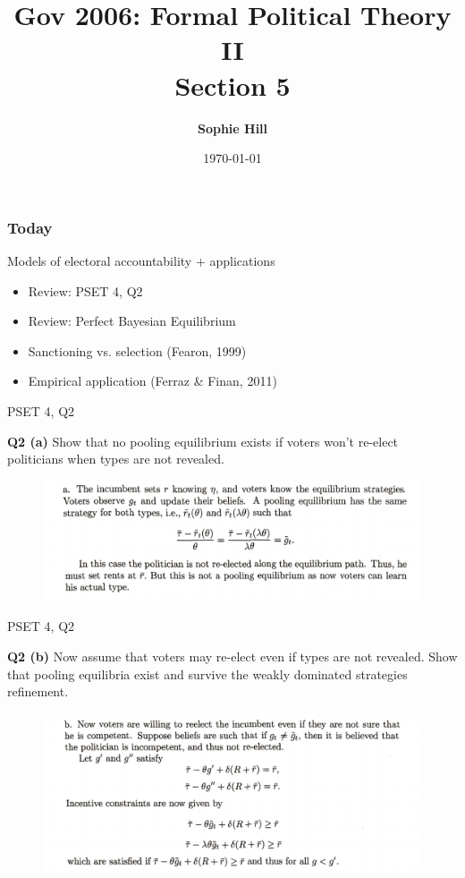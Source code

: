 \documentclass[10pt]{beamer}
\title{Gov 2006: Formal Political Theory II \\
Section 5}
\date{\today}
\author{ \textbf{Sophie Hill}}
\begin{document}
  \maketitle
  

\begin{frame}

\frametitle{Today}

\Large
Models of electoral accountability + applications

\begin{itemize}
\item Review: PSET 4, Q2
\item Review: Perfect Bayesian Equilibrium
\item Sanctioning vs. selection \alert{(Fearon, 1999)}
\item Empirical application \alert{(Ferraz \& Finan, 2011)}
\end{itemize}


\end{frame}
\begin{frame}{PSET 4, Q2}

\textbf{Q2 (a)} Show that no pooling equilibrium exists if voters won't re-elect politicians when types are not revealed.

\begin{figure}
\includegraphics[width=\textwidth]{q21.png}
\end{figure}


\end{frame}
\begin{frame}{PSET 4, Q2}

\textbf{Q2 (b)} Now assume that voters may re-elect even if types are not revealed. Show that pooling equilibria exist and survive the weakly dominated strategies refinement.


\begin{figure}
\includegraphics[width=\textwidth]{q22.png}
\end{figure}


\end{frame}
\end{document}
